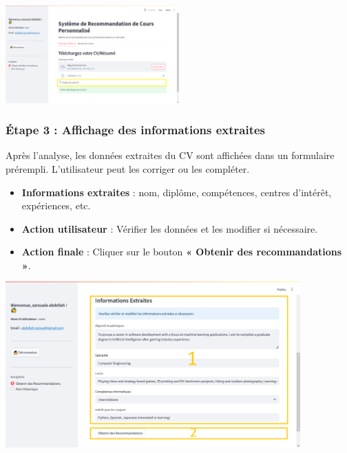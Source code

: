 \begin{center}
\includegraphics[width=0.5\textwidth]{images/analyse cv.png}
\end{center}

\vspace{0.3cm}

\subsubsection*{Étape 3 : Affichage des informations extraites}

Après l’analyse, les données extraites du CV sont affichées dans un formulaire prérempli. L’utilisateur peut les corriger ou les compléter.

\begin{itemize}
  \item \textbf{Informations extraites} : nom, diplôme, compétences, centres d’intérêt, expériences, etc.
  \item \textbf{Action utilisateur} : Vérifier les données et les modifier si nécessaire.
  \item \textbf{Action finale} : Cliquer sur le bouton \textbf{« Obtenir des recommandations »}.
\end{itemize}

\begin{center}
\includegraphics[width=0.85\textwidth]{images/afficher les information extrair.png}
\end{center}

